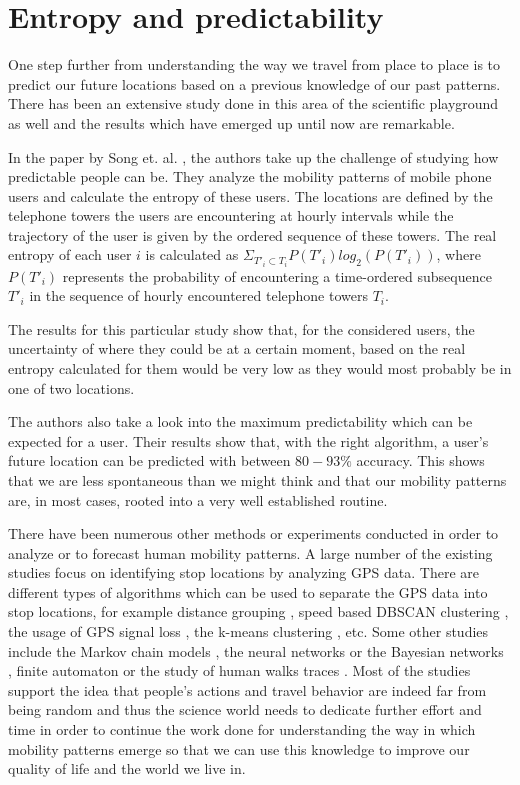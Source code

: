 \section{Entropy and predictability}
One step further from understanding the way we travel from place to place is to
predict our future locations based on a previous knowledge of our past patterns.
There has been an extensive study done in this area of the scientific playground
as well and the results which have emerged up until now are remarkable.

In the paper by Song et. al. \cite{Barabasi10}, the authors take up the
challenge of studying how predictable people can be. They analyze the mobility
patterns of mobile phone users and calculate the entropy of these users. The
locations are defined by the telephone towers the users are encountering at
hourly intervals while the trajectory of the user is given by the ordered
sequence of these towers. The real entropy of each user $i$ is calculated as
$\Sigma _{T'_{i}\subset T_{i}} P(T'_{i})log_{2}(P(T'_{i}))$, where $P(T'_{i})$
represents the probability of encountering a time-ordered subsequence $T'_{i}$
in the sequence of hourly encountered telephone towers $T_{i}$.

The results for this particular study show that, for the considered users, the
uncertainty of where they could be at a certain moment, based on the real
entropy calculated for them would be very low as they would most probably be in
one of two locations.

The authors also take a look into the maximum predictability which can be
expected for a user. Their results show that, with the right algorithm, a user's
future location can be predicted with between $80-93\%$ accuracy. This shows
that we are less spontaneous than we might think and that our mobility patterns
are, in most cases, rooted into a very well established routine.

There have been numerous other methods or experiments conducted in order to
analyze or to forecast human mobility patterns. A large number of the existing
studies focus on identifying stop locations by analyzing GPS data. There are
different types of algorithms which can be used to separate the GPS data into
stop locations, for example distance grouping \cite{cuttone2014inferring}, speed
based DBSCAN clustering \cite{Palma:2008:CAD:1363686.1363886}, the usage of GPS
signal loss \cite{Cao:2010:MSS:1920841.1920968}, the k-means clustering
\cite{Ashbrook:2003:UGL:945305.945310}, etc. Some other studies include the
Markov chain models \cite{Ross09} \cite{Liu96}, the neural networks
\cite{Liou03} or the Bayesian networks \cite{Akoush07}, finite automaton
\cite{Petzold04} or the study of human walks traces \cite{5061995}
\cite{4509740}. Most of the studies support the idea that people's actions and
travel behavior are indeed far from being random and thus the science world
needs to dedicate further effort and time in order to continue the work done for
understanding the way in which mobility patterns emerge so that we can use this
knowledge to improve our quality of life and the world we live in.
